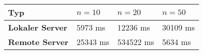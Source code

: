 \begin{tabular}{l|lll}
\rowcolor{heading}
\color{white}\textbf{Typ} &
\color{white}\textbf{$n = 10$} &
\color{white}\textbf{$n = 20$} &
\color{white}\textbf{$n = 50$} \\
\hline
\cellcolor{editorGray}\textbf{Lokaler Server} & 5973 ms & 12236 ms
& 30109 ms\\
\cellcolor{editorGray}\textbf{Remote Server} & 25343 ms & 534522 ms &
5634 ms\\
\hline
\end{tabular}
